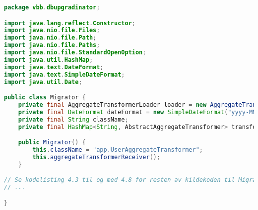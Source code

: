 \begin{lstlisting}[language=Java, caption={Migrator-klassen i DBUpgradinator}]
package vbb.dbupgradinator;

import java.lang.reflect.Constructor;
import java.nio.file.Files;
import java.nio.file.Path;
import java.nio.file.Paths;
import java.nio.file.StandardOpenOption;
import java.util.HashMap;
import java.text.DateFormat;
import java.text.SimpleDateFormat;
import java.util.Date;

public class Migrator {
    private final AggregateTransformerLoader loader = new AggregateTransformerLoader();
    private final DateFormat dateFormat = new SimpleDateFormat("yyyy-MM-dd HH:mm:ss");
    private final String className;
    private final HashMap<String, AbstractAggregateTransformer> transformers = new HashMap<>(4, (float) 0.95);

    public Migrator() {
        this.className = "app.UserAggregateTransformer";
        this.aggregateTransformerReceiver();
    }

// Se kodelisting 4.3 til og med 4.8 for resten av kildekoden til Migrator
// ...

}
\end{lstlisting}
